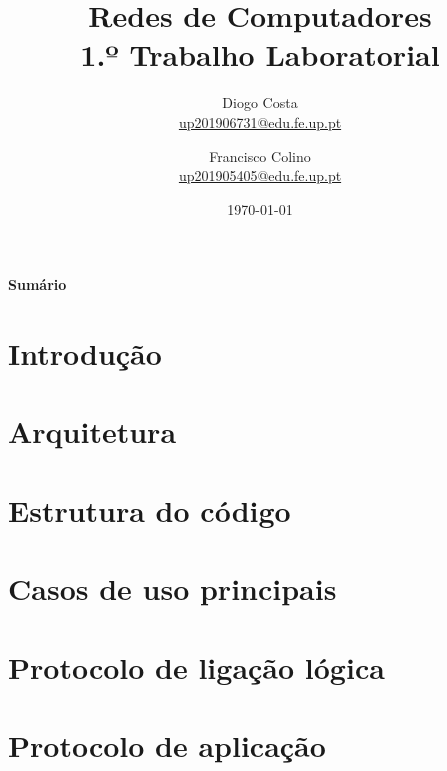 \documentclass[a4paper,11pt,portuguese]{article}
\begin{document}

\author{
    Diogo Costa\\
    \href{mailto:up201906731@edu.fe.up.pt}{up201906731@edu.fe.up.pt}
    \and
    Francisco Colino\\
    \href{mailto:up201905405@edu.fe.up.pt}{up201905405@edu.fe.up.pt}
}
\title{Redes de Computadores \\ \large 1.º Trabalho Laboratorial}
\date{\today}
\maketitle

\begin{center}
    \textbf{Sumário}
\end{center}



\section{Introdução}



\section{Arquitetura}



\section{Estrutura do código}



\section{Casos de uso principais}



\section{Protocolo de ligação lógica}



\section{Protocolo de aplicação}
\end{document}

